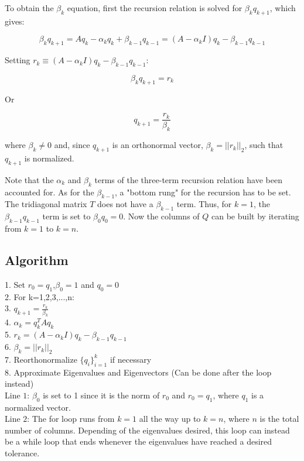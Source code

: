 To obtain the $\beta_{k}$ equation, first the recursion relation is solved for $\beta_{k}q_{k+1}$, which gives:

\[ \beta_{k} q_{k+1} = A q_{k} - \alpha_k q_k + \beta_{k-1} q_{k-1} = (A-\alpha_k I) q_k - \beta_{k-1} q_{k-1} \]

Setting $r_k \equiv (A-\alpha_k I) q_k - \beta_{k-1} q_{k-1}$:

\[ \beta_{k} q_{k+1} = r_{k} \]

Or

 \begin{equation}
q_{k+1} = \frac{r_k}{\beta_{k}}
\end{equation}

where $\beta_{k} \neq 0$ and, since $q_{k+1}$ is an orthonormal vector, $\beta_{k} = || r_k ||_2$, such that $q_{k+1}$ is normalized.

Note that the $\alpha_k$ and $\beta_k$ terms of the three-term recursion relation have been accounted for. As for the $\beta_{k-1}$, a "bottom rung" for the recursion has to be set. The tridiagonal matrix $T$ does not have a $\beta_{k-1}$ term. Thus, for $k=1$, the $\beta_{k-1} q_{k-1}$ term is set to $\beta_{0} q_{0} = 0$. Now the columns of $Q$ can be built by iterating from $k=1$ to $k=n$.

\subsection{Algorithm}

 1. Set $r_0=q_1$,$\beta_0=1$ and $q_0 = 0$ \\
  2. For k=1,2,3,...,n: \\
  3.     $q_{k+1} = \frac{r_k}{\beta_{k}}$ \\
  4.     $\alpha_k = q_k^T A q_k$ \\
  5.     $r_k = (A - \alpha_k I)q_k - \beta_{k-1}q_{k-1}$ \\
  6.     $\beta_k = ||r_k||_2$ \\
  7.     Reorthonormalize $\lbrace q_i \rbrace_{i=1}^{k}$ if necessary \\
  8.     Approximate Eigenvalues and Eigenvectors (Can be done after the loop instead) \\

Line $1$: $\beta_0$ is set to 1 since it is the norm of $r_0$ and $r_0 = q_1$, where $q_1$ is a normalized vector. \\

Line $2$: The for loop runs from $k=1$ all the way up to $k=n$, where $n$ is the total number of columns. Depending of the eigenvalues desired, this loop can instead be a while loop that ends whenever the eigenvalues have reached a desired tolerance. \\

